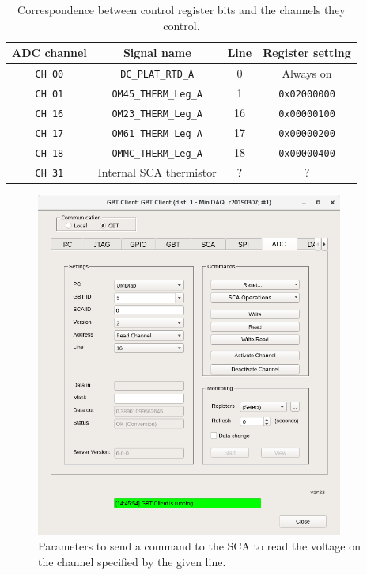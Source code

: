 \begin{table}[ht]
    \begin{tabular}{cccc}
        \toprule
        ADC channel & Signal name & Line & Register setting \\
        \midrule
        \texttt{CH 00} & \texttt{DC\_PLAT\_RTD\_A}    & 0  & Always on \\
        \texttt{CH 01} & \texttt{OM45\_THERM\_Leg\_A} & 1  & \texttt{0x02000000} \\
        \texttt{CH 16} & \texttt{OM23\_THERM\_Leg\_A} & 16 & \texttt{0x00000100} \\
        \texttt{CH 17} & \texttt{OM61\_THERM\_Leg\_A} & 17 & \texttt{0x00000200} \\
        \texttt{CH 18} & \texttt{OMMC\_THERM\_Leg\_A} & 18 & \texttt{0x00000400} \\
        \texttt{CH 31} & Internal SCA thermistor      & ?  & ? \\
        \bottomrule
    \end{tabular}
    \caption{
        Correspondence between control register bits and the channels they
        control.
    }
    \label{tab:register-channel-correspondence}
\end{table}

\begin{figure}[ht]
    \centering
    \includegraphics[width=0.9\textwidth]{res/gbt_client_adc_readout_readchannel.png}
    \caption{
        Parameters to send a command to the SCA to read the voltage on the
        channel specified by the given line.
    }
    \label{fig:adc-readout}
\end{figure}

